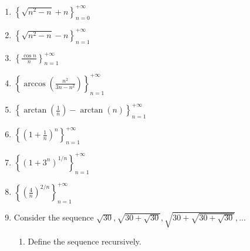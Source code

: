 \documentclass[12pt]{article}
\newif\ifans
\begin{document}
\begin{enumerate}
\item $\left\{ \sqrt{n^2-n} + n \right\}_{n = 0}^{+\infty}$

\ifans{\fbox{Diverges to $+\infty$.}} \fi

\item $\left\{ \sqrt{n^2-n} - n \right\}_{n = 1}^{+\infty}$

\ifans{\fbox{Converges to $-\frac{1}{2}$.}} \fi

\item $\left\{ \frac{\cos{n}}{n} \right\}_{n = 1}^{+\infty}$

\ifans{\fbox{Converges to $0$.  See \underline{Limits at Infinity Review} problem \#7.}} \fi

\item $\left\{\arccos\left(\frac{n^2}{3n-n^2}\right) \right\}_{n = 1}^{+\infty}$

\ifans{\fbox{Converges to $\pi$.}} \fi

\item $\left\{ \arctan\left({\frac{1}{n}}\right) - \arctan{(n)}  \right\}_{n = 1}^{+\infty}$

\ifans{\fbox{Converges to $-\frac{\pi}{2}$.  See \underline{Limits at Infinity Review} problem \#8.}} \fi

\item $\left\{ \left(1+\frac{1}{n}\right)^n \right\}_{n = 1}^{+\infty}$

\ifans{\fbox{Converges to $e$.  See \underline{Limits at Infinity Review} problem \#9.}} \fi

\item $\left\{ \left(1+3^n\right)^{1/n} \right\}_{n = 1}^{+\infty}$

\ifans{\fbox{Converges to $3$.  See \underline{Limits at Infinity Review} problem \#10.; Detailed Solution: \textcolor{blue}{\href{http://www.math.drexel.edu/classes/Calculus/resources/Math123HW/Solutions/123_05_Sequences_35.pdf}{Here}}}} \fi


\item $\left\{ \left(\frac{4}{n}\right)^{2/n} \right\}_{n = 1}^{+\infty}$

\ifans{\fbox{Converges to $1$.}} \fi

\item Consider the sequence $\sqrt{30}, \sqrt{30+\sqrt{30}}, \sqrt{30+\sqrt{30+\sqrt{30}}}, ...$

\begin{enumerate}

\item Define the sequence recursively.


\end{enumerate}
\end{enumerate}
\end{document}
